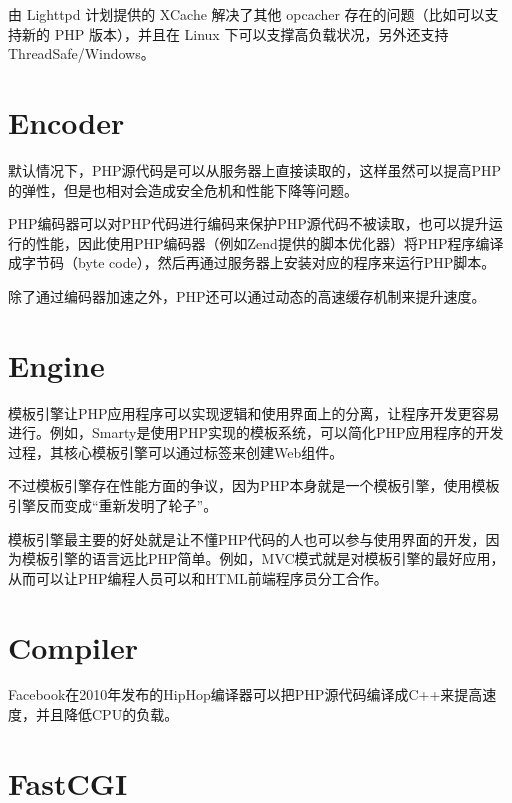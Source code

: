 由 Lighttpd 计划提供的 XCache 解决了其他 opcacher 存在的问题（比如可以支持新的 PHP 版本），并且在 Linux 下可以支撑高负载状况，另外还支持 ThreadSafe/Windows。






\section{Encoder}



默认情况下，PHP源代码是可以从服务器上直接读取的，这样虽然可以提高PHP的弹性，但是也相对会造成安全危机和性能下降等问题。

PHP编码器可以对PHP代码进行编码来保护PHP源代码不被读取，也可以提升运行的性能，因此使用PHP编码器（例如Zend提供的脚本优化器）将PHP程序编译成字节码（byte code），然后再通过服务器上安装对应的程序来运行PHP脚本。


除了通过编码器加速之外，PHP还可以通过动态的高速缓存机制来提升速度。





\section{Engine}

模板引擎让PHP应用程序可以实现逻辑和使用界面上的分离，让程序开发更容易进行。例如，Smarty是使用PHP实现的模板系统，可以简化PHP应用程序的开发过程，其核心模板引擎可以通过标签来创建Web组件。


不过模板引擎存在性能方面的争议，因为PHP本身就是一个模板引擎，使用模板引擎反而变成“重新发明了轮子”。

模板引擎最主要的好处就是让不懂PHP代码的人也可以参与使用界面的开发，因为模板引擎的语言远比PHP简单。例如，MVC模式就是对模板引擎的最好应用，从而可以让PHP编程人员可以和HTML前端程序员分工合作。



\section{Compiler}



Facebook在2010年发布的HipHop编译器可以把PHP源代码编译成C++来提高速度，并且降低CPU的负载。






\section{FastCGI}



